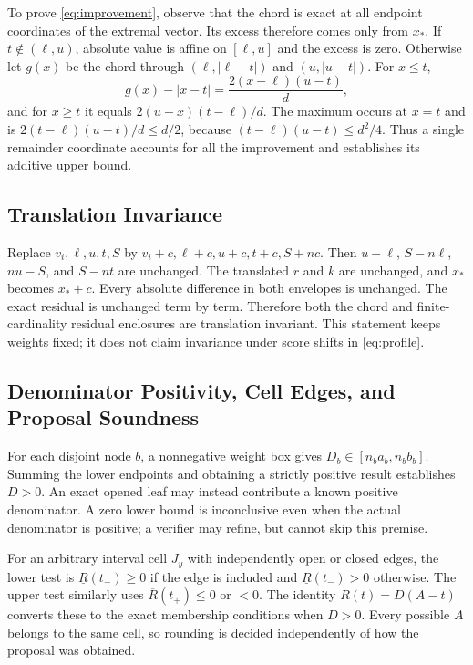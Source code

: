 To prove \cref{eq:improvement}, observe that the chord is exact at all
endpoint coordinates of the extremal vector. Its excess therefore comes
only from $x_*$. If $t\notin(\ell,u)$, absolute value is affine on
$[\ell,u]$ and the excess is zero. Otherwise let $g(x)$ be the chord
through $(\ell,|\ell-t|)$ and $(u,|u-t|)$. For $x\le t$,
\begin{equation}
 g(x)-|x-t|=\frac{2(x-\ell)(u-t)}{d},
\end{equation}
and for $x\ge t$ it equals $2(u-x)(t-\ell)/d$. The maximum occurs
at $x=t$ and is $2(t-\ell)(u-t)/d\le d/2$, because
$(t-\ell)(u-t)\le d^2/4$. Thus a single remainder coordinate accounts
for all the improvement and establishes its additive upper bound.

\subsection{Translation Invariance}

Replace $v_i,\ell,u,t,S$ by
$v_i+c,\ell+c,u+c,t+c,S+nc$. Then $u-\ell$, $S-n\ell$,
$nu-S$, and $S-nt$ are unchanged. The translated $r$ and $k$ are
unchanged, and $x_*$ becomes $x_*+c$. Every absolute difference in both
envelopes is unchanged. The exact residual is unchanged term by term.
Therefore both the chord and finite-cardinality residual enclosures are
translation invariant. This statement keeps weights fixed; it does not
claim invariance under score shifts in \cref{eq:profile}.

\subsection{Denominator Positivity, Cell Edges, and Proposal Soundness}

For each disjoint node $b$, a nonnegative weight box gives
$D_b\in[n_ba_b,n_bb_b]$. Summing the lower endpoints and obtaining a
strictly positive result establishes $D>0$. An exact opened leaf may
instead contribute a known positive denominator. A zero lower bound is
inconclusive even when the actual denominator is positive; a verifier may
refine, but cannot skip this premise.

For an arbitrary interval cell $J_y$ with independently open or closed
edges, the lower test is $\underline R(t_-)\ge0$ if the edge is
included and $\underline R(t_-)>0$ otherwise. The upper test similarly
uses $\overline R(t_+)\le0$ or $<0$. The identity
$R(t)=D(A-t)$ converts these to the exact membership conditions when
$D>0$. Every possible $A$ belongs to the same cell, so rounding is
decided independently of how the proposal was obtained.

